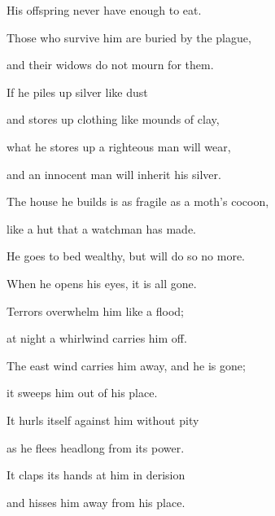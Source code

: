 {\par }{\Q His offspring
never
have enough
to eat.
\par }{\Q {}Those who survive
him are buried
by the plague,

\par }{\Q and their widows
do not
mourn for them.
\par }{\Q {}If
he piles
up silver
like dust
\par }{\Q and stores
up clothing
like mounds of clay,
\par }{\Q {}what
he stores
up a righteous
man will wear,
\par }{\Q and an innocent
man will inherit
his silver.
\par }{\Q {}The house
he builds
is as fragile as a moth’s
cocoon,
\par }{\Q like a hut
that a watchman has made.
\par }{\Q {}He goes to bed
wealthy,
but will do so no
more.
\par }{\Q When he opens
his eyes,
it is all gone.
\par }{\Q {}Terrors
overwhelm
him like a flood;
\par }{\Q at night
a whirlwind carries him off.
\par }{\Q {}The east wind
carries
him away, and he is gone;
\par }{\Q it sweeps
him out of his place.
\par }{\Q {}It hurls itself
against
him without
pity
\par }{\Q as he flees
headlong
from its power.
\par }{\Q {}It claps
its hands
at him in derision
\par }{\Q and hisses
him away from his place.

}
